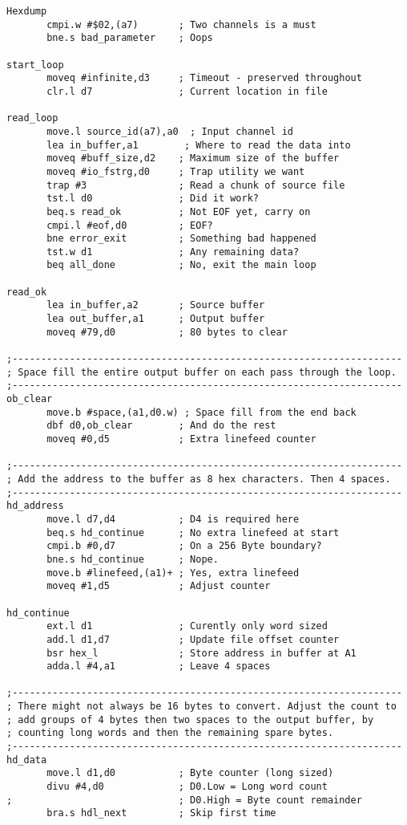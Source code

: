 \begin{lstlisting}[firstnumber=1,caption={Hexdump Utility}]
Hexdump
       cmpi.w #$02,(a7)       ; Two channels is a must
       bne.s bad_parameter    ; Oops

start_loop
       moveq #infinite,d3     ; Timeout - preserved throughout
       clr.l d7               ; Current location in file

read_loop
       move.l source_id(a7),a0  ; Input channel id
       lea in_buffer,a1        ; Where to read the data into
       moveq #buff_size,d2    ; Maximum size of the buffer
       moveq #io_fstrg,d0     ; Trap utility we want
       trap #3                ; Read a chunk of source file
       tst.l d0               ; Did it work?
       beq.s read_ok          ; Not EOF yet, carry on
       cmpi.l #eof,d0         ; EOF?
       bne error_exit         ; Something bad happened
       tst.w d1               ; Any remaining data?
       beq all_done           ; No, exit the main loop

read_ok
       lea in_buffer,a2       ; Source buffer
       lea out_buffer,a1      ; Output buffer
       moveq #79,d0           ; 80 bytes to clear

;--------------------------------------------------------------------
; Space fill the entire output buffer on each pass through the loop.
;--------------------------------------------------------------------
ob_clear
       move.b #space,(a1,d0.w) ; Space fill from the end back
       dbf d0,ob_clear        ; And do the rest
       moveq #0,d5            ; Extra linefeed counter

;--------------------------------------------------------------------
; Add the address to the buffer as 8 hex characters. Then 4 spaces.
;--------------------------------------------------------------------
hd_address
       move.l d7,d4           ; D4 is required here
       beq.s hd_continue      ; No extra linefeed at start
       cmpi.b #0,d7           ; On a 256 Byte boundary?
       bne.s hd_continue      ; Nope.
       move.b #linefeed,(a1)+ ; Yes, extra linefeed
       moveq #1,d5            ; Adjust counter

hd_continue
       ext.l d1               ; Curently only word sized
       add.l d1,d7            ; Update file offset counter
       bsr hex_l              ; Store address in buffer at A1
       adda.l #4,a1           ; Leave 4 spaces

;--------------------------------------------------------------------
; There might not always be 16 bytes to convert. Adjust the count to
; add groups of 4 bytes then two spaces to the output buffer, by 
; counting long words and then the remaining spare bytes.
;--------------------------------------------------------------------
hd_data
       move.l d1,d0           ; Byte counter (long sized)
       divu #4,d0             ; D0.Low = Long word count
;                             ; D0.High = Byte count remainder
       bra.s hdl_next         ; Skip first time


\end{lstlisting}
